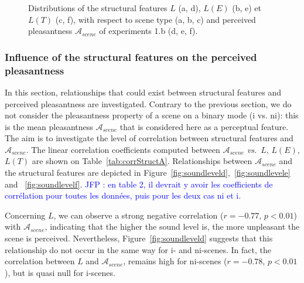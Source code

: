 \documentclass[preprint,12pt]{elsarticle}
\newcommand{\jfp}[1]{\textcolor{blue}{JFP : #1}}
\newcommand{\vs}{\emph{vs.}}
\begin{document}
\begin{figure}[t]
       \caption{Distributions of the structural features $L$ (a, d), $L(E)$ (b, e) et $L(T)$ (c, f), with respect to scene type (a, b, c) and perceived pleasantness $\mathcal{A}_{scene}$ of experiments 1.b (d, e, f).}
\end{figure}

\subsubsection*{Influence of the structural features on the perceived pleasantness}

In this section, relationships that could exist between structural features and perceived pleasantness are investigated. Contrary to the previous section, we do not consider the pleasantness property of a scene on a binary mode (i vs. ni): this is the mean pleasantness $\mathcal{A}_{scene}$ that is considered here as a perceptual feature. The aim is to investigate the level of correlation between structural features and $\mathcal{A}_{scene}$. The linear correlation coefficients computed between $\mathcal{A}_{scene}$ \vs~$L$, $L(E)$, $L(T)$ are shown on Table~\ref{tab:corrStructA}. Relationships between $\mathcal{A}_{scene}$ and the structural features are depicted in Figure~\ref{fig:soundleveld},~\ref{fig:soundlevele} and ~\ref{fig:soundlevelf}.  \jfp{en table 2, il devrait y avoir les coefficients de corrélation pour toutes les données, puis pour les deux cas ni et i.
}

Concerning $L$, we can observe a strong negative correlation ($r=-0.77$, $p<0.01$) with $\mathcal{A}_{scene}$, indicating that the higher the sound level is, the more unpleasant the scene is perceived. Nevertheless, Figure~\ref{fig:soundleveld} suggests that this relationship do not occur in the same way for i- and ni-scenes. In fact, the correlation between $L$ and $\mathcal{A}_{scene}$, remains high for ni-scenes ($r=-0.78$, $p<0.01$), but is quasi null for i-scenes.
\end{document}
